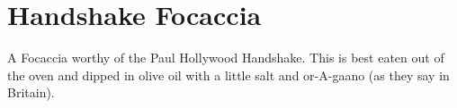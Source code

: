 \section{
    Handshake Focaccia
}

\begin{recipestats}[
        servings=6 people,
        preptime=1 \hour,
        bakingtime=15 \minute,
        inactivetime=2 \hour,
        source=\citefield{howToBake2013}{title}~\cite{howToBake2013},
    ]
\end{recipestats}

\begin{recipeabstract}
    A Focaccia worthy of the Paul Hollywood Handshake.
    This is best eaten out of the oven and dipped in olive oil with a little
    salt and or-A-gaano (as they say in Britain).
\end{recipeabstract}

\begin{ingredientcolumns}
    \begin{ingredientblock}
        \\
        \\
    \end{ingredientblock}
    \begin{ingredientblock}
        \\
        \\
    \end{ingredientblock}
\end{ingredientcolumns}

